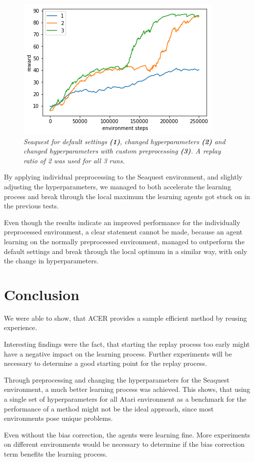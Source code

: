 \begin{figure}[h]
\includegraphics[scale=0.8]{bilder/seaquestprepro.png}
\caption{\textit{Seaquest for default settings \textbf{(1)}, changed hyperparameters \textbf{(2)} and changed hyperparameters with custom preprocessing \textbf{(3)}. A replay ratio of 2 was used for all 3 runs.}}
\end{figure}
\pagebreak
By applying individual preprocessing to the Seaquest environment, and slightly adjusting the hyperparameters, we managed to both accelerate the learning process and break through the local maximum the learning agents got stuck on in the previous tests.

Even though the results indicate an improved performance for the individually preprocessed environment, a clear statement cannot be made, because an agent learning on the normally preprocessed environment, managed to outperform the default settings and break through the local optimum in a similar way, with only the change in hyperparameters.

\pagebreak

\section{Conclusion}

We were able to show, that ACER provides a sample efficient method by reusing experience.

Interesting findings were the fact, that starting the replay process too early might have a negative impact on the learning process.
Further experiments will be necessary to determine a good starting point for the replay process.

Through preprocessing and changing the hyperparameters for the Seaquest environment, a much better learning process was achieved.
This shows, that using a single set of hyperparameters for all Atari environment as a benchmark for the performance of a method might not be the ideal approach, since most environments pose unique problems.

Even without the bias correction, the agents were learning fine. More experiments on different environments would be necessary to determine if the bias correction term benefits the learning process.
\pagebreak